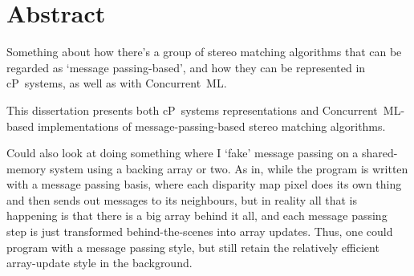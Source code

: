 

\chapter*{Abstract}
Something about how there's a group of stereo matching algorithms that can be regarded as `message passing-based', and how they can be represented in cP~systems, as well as with Concurrent~ML.

This dissertation presents both cP~systems representations and Concurrent~ML-based implementations of message-passing-based stereo matching algorithms.

Could also look at doing something where I `fake' message passing on a shared-memory system using a backing array or two.  As in, while the program is written with a message passing basis, where each disparity map pixel does its own thing and then sends out messages to its neighbours, but in reality all that is happening is that there is a big array behind it all, and each message passing step is just transformed behind-the-scenes into array updates.  Thus, one could program with a message passing style, but still retain the relatively efficient array-update style in the background.